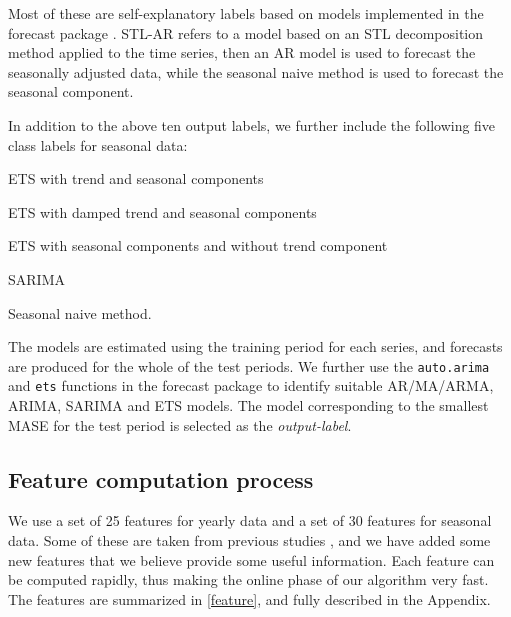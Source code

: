 \documentclass[11pt,a4paper,]{article}
\theoremstyle{definition}
\theoremstyle{definition}
\theoremstyle{definition}
\theoremstyle{remark}
\begin{document}
Most of these are self-explanatory labels based on models implemented in
the forecast package \autocite{forecast}. STL-AR refers to a model based
on an STL decomposition method applied to the time series, then an AR
model is used to forecast the seasonally adjusted data, while the
seasonal naive method is used to forecast the seasonal component.

In addition to the above ten output labels, we further include the
following five class labels for seasonal data:

\begin{compactenum}[\hspace*{1cm}(a)]\setcounter{enumi}{10}
  \item ETS with trend and seasonal components
  \item ETS with damped trend and seasonal components
  \item ETS with seasonal components and without trend component
  \item SARIMA
  \item Seasonal naive method.
  \end{compactenum}

The models are estimated using the training period for each series, and
forecasts are produced for the whole of the test periods. We further use
the \texttt{auto.arima} and \texttt{ets} functions in the forecast
package to identify suitable AR/MA/ARMA, ARIMA, SARIMA and ETS models.
The model corresponding to the smallest MASE
\autocite{hyndman2006another} for the test period is selected as the
\emph{output-label}.

\subsection{Feature computation process}\label{sec:features}

We use a set of 25 features for yearly data and a set of 30 features for
seasonal data. Some of these are taken from previous studies
\autocites{wang2009rule}{hyndman2015large}{kang2017visualising}, and we
have added some new features that we believe provide some useful
information. Each feature can be computed rapidly, thus making the
online phase of our algorithm very fast. The features are summarized in
\autoref{feature}, and fully described in the Appendix.
\end{document}
